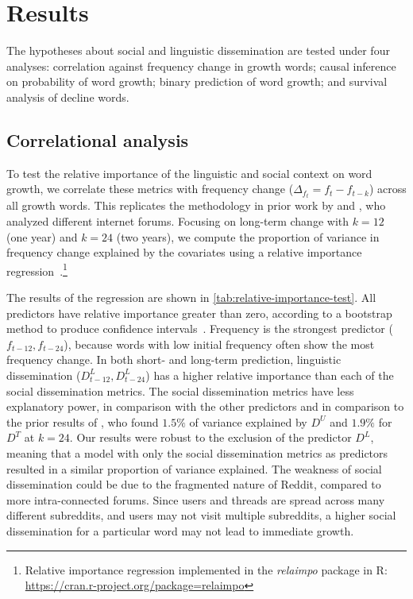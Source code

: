 \section{Results}
The hypotheses about social and linguistic dissemination are tested under four analyses: correlation against frequency change in growth words; causal inference on probability of word growth; binary prediction of word growth; and survival analysis of decline words.

\subsection{Correlational analysis}
\label{subsec:relative-importance}
To test the relative importance of the linguistic and social context on word growth, we correlate these metrics with frequency change ($\Delta_{f_{t}} = f_{t} - f_{t-k}$) across all growth words. 
This replicates the methodology in prior work by  and , who analyzed different internet forums.
Focusing on long-term change with $k=12$ (one year) and $k=24$ (two years), 
we compute the proportion of variance in frequency change explained by the covariates using a relative importance regression~\cite{kruskal1987}.\footnote{Relative importance regression implemented in the \emph{relaimpo} package in R: \url{https://cran.r-project.org/package=relaimpo}}

The results of the regression are shown in \autoref{tab:relative-importance-test}. 
All predictors have relative importance greater than zero, according to a bootstrap method to produce confidence intervals~\cite{tonidandel2009}. 
Frequency is the strongest predictor ($f_{t-12}, f_{t-24}$), because words with low initial frequency often show the most frequency change.
In both short- and long-term prediction, linguistic dissemination ($D^{L}_{t-12}, D^{L}_{t-24}$) has a higher relative importance than each of the social dissemination metrics.
The social dissemination metrics have less explanatory power, in comparison with the other predictors and in comparison to the prior results of , who found $1.5\%$ of variance explained by $D^{U}$ and $1.9\%$ for $D^{T}$ at $k=24$.
Our results were robust to the exclusion of the predictor $D^L$, meaning that a model with only the social dissemination metrics as predictors resulted in a similar proportion of variance explained.
The weakness of social dissemination could be due to the fragmented nature of Reddit, compared to more intra-connected forums. 
Since users and threads are spread across many different subreddits, and users may not visit multiple subreddits, a higher social dissemination for a particular word may not lead to immediate growth.

